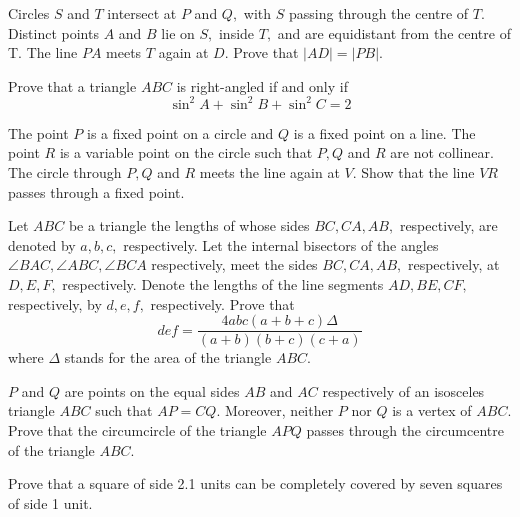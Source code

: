 \documentclass{pset}
\begin{document}
\begin{problems}
\begin{problem}[IrMO 2008 Q7]
    Circles \(S\) and \(T\) intersect at \(P\) and \(Q,\) with \(S\) passing through the centre of \(T\). Distinct points \(A\) and \(B\) lie on \(S,\) inside \(T,\) and are equidistant from the centre of
    T. The line \(P A\) meets \(T\) again at \(D .\) Prove that \(|A D|=|P B| .\)
\end{problem}

\begin{problem}[IrMO 2007 Q2]
    Prove that a triangle \(A B C\) is right-angled if and only if
    $$
    \sin ^{2} A+\sin ^{2} B+\sin ^{2} C=2
    $$
\end{problem}

\begin{problem}[IrMO 2007 Q3]
    The point \(P\) is a fixed point on a circle and \(Q\) is a fixed point on a line. The point \(R\) is a variable point on the circle such that \(P, Q\) and \(R\) are not collinear. The circle through \(P, Q\) and \(R\) meets the line again at \(V .\) Show that the line \(V R\) passes through a fixed point.
\end{problem}

\begin{problem}[IrMO 2007 Q8]
    Let \(A B C\) be a triangle the lengths of whose sides \(B C, C A, A B,\) respectively, are denoted by \(a, b, c,\) respectively. Let the internal bisectors of the angles \(\angle B A C, \angle A B C, \angle B C A\) respectively, meet the sides \(B C, C A, A B,\) respectively, at \(D, E, F,\) respectively. Denote the lengths of the line segments \(A D, B E, C F,\) respectively, by \(d, e, f,\) respectively. Prove that
    $$
    def=\frac{4 a b c(a+b+c) \Delta}{(a+b)(b+c)(c+a)}
    $$
    where \(\Delta\) stands for the area of the triangle \(A B C .\)
\end{problem}


\begin{problem}[IrMO 2006 Q2]
    \(P\) and \(Q\) are points on the equal sides \(A B\) and \(A C\) respectively of an isosceles triangle \(A B C\) such that \(A P=C Q .\) Moreover, neither \(P\) nor \(Q\) is a vertex of \(A B C .\) Prove that the circumcircle of the triangle \(A P Q\) passes through the circumcentre of the triangle \(A B C .\)
\end{problem}

\begin{problem}[IrMO 2006 Q3]
    Prove that a square of side 2.1 units can be completely covered by seven squares of side 1 unit.
\end{problem}


\end{problems}
\end{document}

